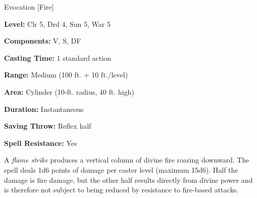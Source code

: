 
Evocation [Fire]

\textbf{Level:} Clr 5, Drd 4, Sun 5, War 5

\textbf{Components:} V, S, DF

\textbf{Casting Time:} 1 standard action

\textbf{Range:} Medium (100 ft. + 10 ft./level)

\textbf{Area:} Cylinder (10-ft. radius, 40 ft. high)

\textbf{Duration:} Instantaneous

\textbf{Saving Throw:} Reflex half

\textbf{Spell Resistance:} Yes

A \textit{flame strike} produces a vertical column of divine fire roaring downward. 
The spell deals 1d6 points of damage per caster level (maximum 15d6). Half the 
damage is fire damage, but the other half results directly from divine power and 
is therefore not subject to being reduced by resistance to fire-based attacks.

